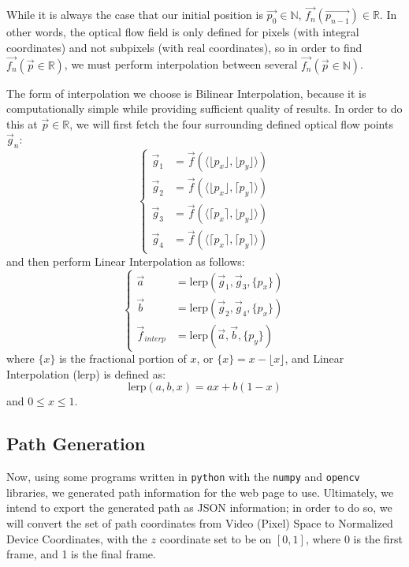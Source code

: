 While it is always the case that our initial position is $\vec{p_0} \in \mathbb{N}$, $\vec{f_n}(\vec{p_{n-1}}) \in \mathbb{R}$. In other words, the optical flow field is only defined for pixels (with integral coordinates) and not subpixels (with real coordinates), so in order to find $\vec{f_n}(\vec{p} \in \mathbb{R})$, we must perform interpolation between several $\vec{f_n}(\vec{p} \in \mathbb{N})$.
\par The form of interpolation we choose is Bilinear Interpolation, because it is computationally simple while providing sufficient quality of results. In order to do this at $\vec{p} \in \mathbb{R}$, we will first fetch the four surrounding defined optical flow points $\vec{g}_n$:
\begin{equation}
\begin{cases}
    \vec{g}_1 & = \vec{f}(\langle \lfloor p_x \rfloor, \lfloor p_y \rfloor \rangle) \\
    \vec{g}_2 & = \vec{f}(\langle \lfloor p_x \rfloor, \lceil p_y \rceil \rangle) \\
    \vec{g}_3 & = \vec{f}(\langle \lceil p_x \rceil, \lfloor p_y \rfloor \rangle) \\
    \vec{g}_4 & = \vec{f}(\langle \lceil p_x \rceil, \lceil p_y \rceil \rangle)
\end{cases}
\end{equation}
and then perform Linear Interpolation as follows:
\begin{equation}
\begin{cases}
    \vec{a} & = \text{lerp} (\vec{g}_1, \vec{g}_3, \{p_x\}) \\
    \vec{b} & = \text{lerp} (\vec{g}_2, \vec{g}_4, \{p_x\}) \\
    \vec{f}_{interp} & = \text{lerp} (\vec{a}, \vec{b}, \{p_y\})
\end{cases}
\end{equation}
where $\{x\}$ is the fractional portion of $x$, or $\{x\} = x - \lfloor x \rfloor$, and Linear Interpolation (lerp) is defined as:
\begin{equation}
    \text{lerp}(a, b, x) = ax + b(1-x)
\end{equation}
and $0 \leq x \leq 1$.

\subsection{Path Generation}
Now, using some programs  written in \texttt{python} with the \texttt{numpy} and \texttt{opencv} libraries, we generated path information for the web page to use. Ultimately, we intend to export the generated path as JSON information; in order to do so, we will convert the set of path coordinates from Video (Pixel) Space to Normalized Device Coordinates, with the $z$ coordinate set to be on $[0,1]$, where 0 is the first frame, and 1 is the final frame.
